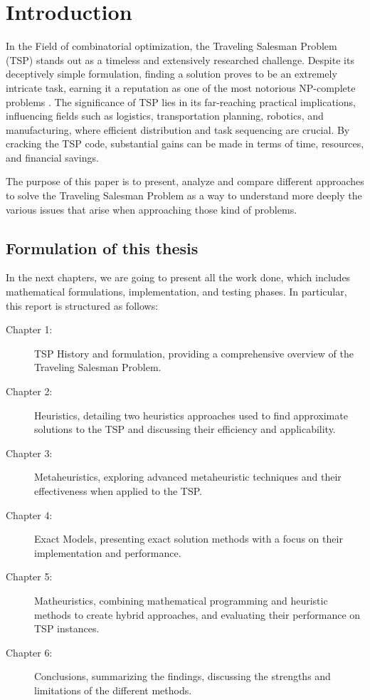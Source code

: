 \chapter{Introduction}
In the Field of combinatorial optimization, the Traveling Salesman Problem (TSP) stands out as a timeless and extensively researched challenge. Despite its deceptively simple formulation, finding a solution proves to be an extremely intricate task, earning it a reputation as one of the most notorious NP-complete problems \cite{np_comp}. The significance of TSP lies in its far-reaching practical implications, influencing fields such as logistics, transportation planning, robotics, and manufacturing, where efficient distribution and task sequencing are crucial. By cracking the TSP code, substantial gains can be made in terms of time, resources, and financial savings.

\noindent The purpose of this paper is to present, analyze and compare different approaches to solve the Traveling Salesman Problem \cite{10.5555/1614191} as a way to understand more deeply the various issues that arise when approaching those kind of problems.

\section{Formulation of this thesis}
In the next chapters, we are going to present all the work done, which includes mathematical formulations, implementation, and testing phases. In particular, this report is structured as follows:

\begin{description}
    \item[Chapter 1:] TSP History and formulation, providing a comprehensive overview of the Traveling Salesman Problem.
    \item[Chapter 2:] Heuristics, detailing two heuristics approaches used to find approximate solutions to the TSP and discussing their efficiency and applicability.
    \item[Chapter 3:] Metaheuristics, exploring advanced metaheuristic techniques and their effectiveness when applied to the TSP.
    \item[Chapter 4:] Exact Models, presenting exact solution methods with a focus on their implementation and performance.
    \item[Chapter 5:] Matheuristics, combining mathematical programming and heuristic methods to create hybrid approaches, and evaluating their performance on TSP instances.
    \item[Chapter 6:] Conclusions, summarizing the findings, discussing the strengths and limitations of the different methods.
\end{description}

